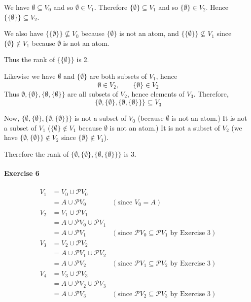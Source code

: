 \documentclass{report}
\begin{document}
    We have $\emptyset \subseteq V_0$ and so $\emptyset \in V_1$. Therefore $\{ \emptyset \} \subseteq V_1$
    and so $\{ \emptyset \} \in V_2$. Hence
    $\{ \{ \emptyset \} \} \subseteq V_2$.

    We also have $\{ \{ \emptyset \} \} \nsubseteq V_0$ because $\{ \emptyset \}$ is not an atom,
    and $\{ \{ \emptyset \} \} \nsubseteq V_1$ since $\{ \emptyset \} \notin V_1$ because $\emptyset$ is not an atom.

    Thus the rank of $\{ \{ \emptyset \} \}$ is 2.

    Likewise we have $\emptyset$ and $\{ \emptyset \}$ are both subsets of $V_1$, hence
    \[ \emptyset \in V_2, \qquad \{ \emptyset \} \in V_2 \]
    Thus $\emptyset, \{ \emptyset \}, \{ \emptyset, \{ \emptyset \} \}$ are all subsets of $V_2$,
    hence elements of $V_3$. Therefore,
    \[ \{ \emptyset, \{ \emptyset \}, \{ \emptyset, \{ \emptyset \} \} \} \subseteq V_3 \]

    Now, $\{ \emptyset, \{ \emptyset \}, \{ \emptyset, \{ \emptyset \} \} \}$ is not a subset of $V_0$
    (because $\emptyset$ is not an atom.) It is not a subset of $V_1$ ($\{ \emptyset \} \notin V_1$
    because $\emptyset$ is not an atom.) It is not a subset of $V_2$ (we have
    $\{ \emptyset, \{ \emptyset \} \} \notin V_2$ since $\{ \emptyset \} \notin V_1$).

    Therefore the rank of
    $\{ \emptyset, \{ \emptyset \}, \{ \emptyset, \{ \emptyset \} \} \}$ is 3.
    
    \paragraph{Exercise 6}

    \begin{align*}
        V_1 & = V_0 \cup \mathcal{P} V_0 \\
        & = A \cup \mathcal{P} V_0 & (\text{since } V_0 = A) \\
        V_2 & = V_1 \cup \mathcal{P} V_1 \\
        & = A \cup \mathcal{P} V_0 \cup \mathcal{P} V_1 \\
        & = A \cup \mathcal{P} V_1 & (\text{since } \mathcal{P} V_0 \subseteq \mathcal{P} V_1 \text{ by Exercise 3}) \\
        V_3 & = V_2 \cup \mathcal{P} V_2 \\
        & = A \cup \mathcal{P} V_1 \cup \mathcal{P} V_2 \\
        & = A \cup \mathcal{P} V_2 & (\text{since } \mathcal{P} V_1 \subseteq \mathcal{P} V_2 \text{ by Exercise 3}) \\
        V_4 & = V_3 \cup \mathcal{P} V_3 \\
        & = A \cup \mathcal{P} V_2 \cup \mathcal{P} V_3 \\
        & = A \cup \mathcal{P} V_3 & (\text{since } \mathcal{P} V_2 \subseteq \mathcal{P} V_3 \text{ by Exercise 3}) \\        
    \end{align*}
\end{document}
